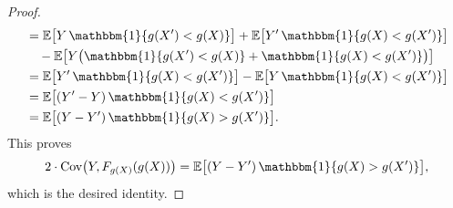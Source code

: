 \documentclass[11pt]{article}
\theoremstyle{plain}
\theoremstyle{plain}
\theoremstyle{plain}
\theoremstyle{plain}
\theoremstyle{plain}
\theoremstyle{plain}
\theoremstyle{plain}
\begin{document}
\begin{proof}
\begin{align}
    &= \mathbb{E}\big[ Y\,\mathbbm{1}\{g(X') < g(X)\} \big]
     + \mathbb{E}\big[ Y'\,\mathbbm{1}\{g(X) < g(X')\} \big] \notag \\
    &\quad - \mathbb{E}\big[ Y\big(\mathbbm{1}\{g(X') < g(X)\} + \mathbbm{1}\{g(X) < g(X')\}\big) \big] \notag \\
    &= \mathbb{E}\big[ Y'\,\mathbbm{1}\{g(X) < g(X')\} \big]
     - \mathbb{E}\big[ Y\,\mathbbm{1}\{g(X) < g(X')\} \big] \notag \\
    &= \mathbb{E}\big[ (Y' - Y)\,\mathbbm{1}\{g(X) < g(X')\} \big] \notag \\
    &= \mathbb{E}\big[ (Y - Y')\,\mathbbm{1}\{g(X) > g(X')\} \big].
\end{align}
This proves
\[
2\cdot\text{Cov}\big(Y, F_{g(X)}(g(X))\big)
= \mathbb{E}\big[ (Y - Y')\,\mathbbm{1}\{g(X) > g(X')\} \big],
\]
which is the desired identity.
\end{proof}

\end{document}
